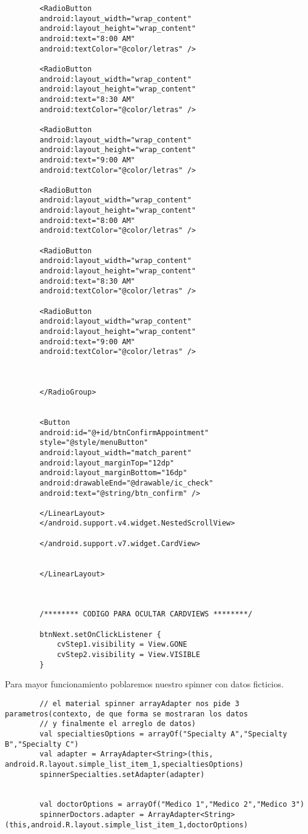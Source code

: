\documentclass[a4paper]{article}
\begin{document}
\begin{lstlisting}
		<RadioButton
		android:layout_width="wrap_content"
		android:layout_height="wrap_content"
		android:text="8:00 AM"
		android:textColor="@color/letras" />
		
		<RadioButton
		android:layout_width="wrap_content"
		android:layout_height="wrap_content"
		android:text="8:30 AM"
		android:textColor="@color/letras" />
		
		<RadioButton
		android:layout_width="wrap_content"
		android:layout_height="wrap_content"
		android:text="9:00 AM"
		android:textColor="@color/letras" />
		
		<RadioButton
		android:layout_width="wrap_content"
		android:layout_height="wrap_content"
		android:text="8:00 AM"
		android:textColor="@color/letras" />
		
		<RadioButton
		android:layout_width="wrap_content"
		android:layout_height="wrap_content"
		android:text="8:30 AM"
		android:textColor="@color/letras" />
		
		<RadioButton
		android:layout_width="wrap_content"
		android:layout_height="wrap_content"
		android:text="9:00 AM"
		android:textColor="@color/letras" />
		
		
		
		</RadioGroup>
		
		
		<Button
		android:id="@+id/btnConfirmAppointment"
		style="@style/menuButton"
		android:layout_width="match_parent"
		android:layout_marginTop="12dp"
		android:layout_marginBottom="16dp"
		android:drawableEnd="@drawable/ic_check"
		android:text="@string/btn_confirm" />
		
		</LinearLayout>
		</android.support.v4.widget.NestedScrollView>
		
		</android.support.v7.widget.CardView>
		
		
		</LinearLayout>
		
		
		
		/******** CODIGO PARA OCULTAR CARDVIEWS ********/
		
		btnNext.setOnClickListener {
			cvStep1.visibility = View.GONE
			cvStep2.visibility = View.VISIBLE
		}
	\end{lstlisting}

	Para mayor funcionamiento poblaremos nuestro spinner con datos ficticios.
	
	\begin{lstlisting}
		// el material spinner arrayAdapter nos pide 3 parametros(contexto, de que forma se mostraran los datos
		// y finalmente el arreglo de datos)
		val specialtiesOptions = arrayOf("Specialty A","Specialty B","Specialty C")
		val adapter = ArrayAdapter<String>(this, android.R.layout.simple_list_item_1,specialtiesOptions)
		spinnerSpecialties.setAdapter(adapter)
		
		
		val doctorOptions = arrayOf("Medico 1","Medico 2","Medico 3")
		spinnerDoctors.adapter = ArrayAdapter<String>(this,android.R.layout.simple_list_item_1,doctorOptions)
		
	\end{lstlisting}
	
\end{document}
